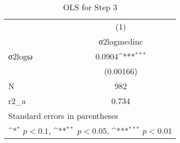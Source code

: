 \begin{table}[htbp]\centering
\def\sym#1{\ifmmode^{#1}\else\(^{#1}\)\fi}
\caption{OLS for Step 3 \label{Q24Tab1}}
\begin{tabular}{l*{1}{c}}
\toprule
                    &\multicolumn{1}{c}{(1)}\\
                    &\multicolumn{1}{c}{σ2logmedinc}\\
\midrule
σ2logω            &      0.0904\sym{***}\\
                    &   (0.00166)         \\
\midrule
N                   &         982         \\
r2\_a                &       0.734         \\
\bottomrule
\multicolumn{2}{l}{\footnotesize Standard errors in parentheses}\\
\multicolumn{2}{l}{\footnotesize \sym{*} \(p<0.1\), \sym{**} \(p<0.05\), \sym{***} \(p<0.01\)}\\
\end{tabular}
\end{table}
